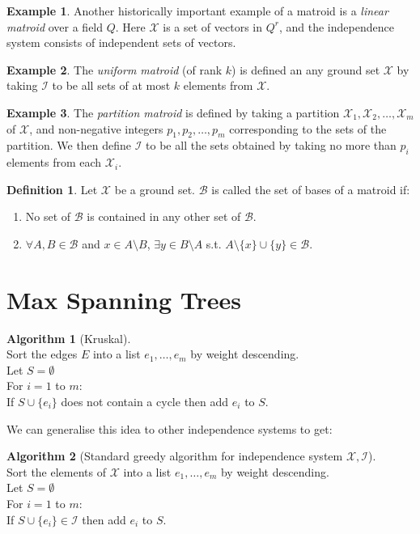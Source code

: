 \documentclass{article}
\theoremstyle{definition}
\newtheorem*{defn}{Definition}
\newtheorem*{ex}{Example}
\newtheorem*{alg}{Algorithm}
\newcommand{\X}{\mathcal{X}}
\newcommand{\I}{\mathcal{I}}
\newcommand{\B}{\mathcal{B}}
\begin{document}
\begin{ex}
Another historically important example of a matroid is a \emph{linear matroid} over a field $Q$.
Here $\X$ is a set of vectors in $Q^r$, and the independence system consists of independent sets of vectors.
\end{ex}

\begin{ex}
The \emph{uniform matroid} (of rank $k$) is defined an any ground set $\X$ by taking $\I$ to be all sets of at most $k$ elements from $\X$. 
\end{ex}

\begin{ex}
The \emph{partition matroid} is defined by taking a partition $\X_1,\X_2,\ldots,\X_m$ of $\X$, and non-negative integers $p_1,p_2,\ldots,p_m$ corresponding to the sets of the partition.
We then define $\I$ to be all the sets obtained by taking no more than $p_i$ elements from each $\X_i$.
\end{ex}

\begin{defn}
Let $\X$ be a ground set.
$\B$ is called the set of bases of a matroid if:
\begin{enumerate}
\item No set of $\B$ is contained in any other set of $\B$.
\item $\forall A,B\in\B$ and $x\in A\setminus B$, $\exists y\in B\setminus A$ s.t. $A\setminus\{x\}\cup\{y\} \in \B$.
\end{enumerate}
\end{defn}


\section{Max Spanning Trees}

\begin{alg}[Kruskal]~\\
Sort the edges $E$ into a list $e_1,\ldots,e_m$ by weight descending. \\
Let $S=\emptyset$ \\
For $i = 1$ to $m$:\\
\indent If $S\cup \{e_i\}$ does not contain a cycle then add $e_i$ to $S$.
\end{alg}

We can generalise this idea to other independence systems to get:

\begin{alg}[Standard greedy algorithm for independence system $\X,\I$]~\\
Sort the elements of $\X$ into a list $e_1,\ldots,e_m$ by weight descending. \\
Let $S=\emptyset$ \\
For $i = 1$ to $m$:\\
\indent If $S\cup \{e_i\}\in\I$ then add $e_i$ to $S$.
\end{alg}
\end{document}
